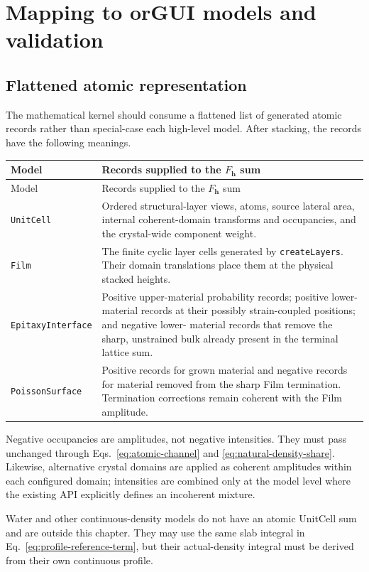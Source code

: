 \chapter{Mapping to orGUI models and validation}
\label{chap:mapping}

\section{Flattened atomic representation}

The mathematical kernel should consume a flattened list of generated atomic
records rather than special-case each high-level model.  After stacking, the
records have the following meanings.

\begin{longtable}{@{}p{}p{}@{}}
\toprule
Model & Records supplied to the $F_{\bm h}$ sum \\
\midrule
\endfirsthead
\toprule
Model & Records supplied to the $F_{\bm h}$ sum \\
\midrule
\endhead
\texttt{UnitCell}
& Ordered structural-layer views, atoms, source lateral area, internal
coherent-domain transforms and occupancies, and the crystal-wide component
weight. \\
\texttt{Film}
& The finite cyclic layer cells generated by \texttt{createLayers}.  Their
domain translations place them at the physical stacked heights. \\
\texttt{EpitaxyInterface}
& Positive upper-material probability records; positive lower-material
records at their possibly strain-coupled positions; and negative lower-
material records that remove the sharp, unstrained bulk already present in
the terminal lattice sum. \\
\texttt{PoissonSurface}
& Positive records for grown material and negative records for material
removed from the sharp Film termination.  Termination corrections remain
coherent with the Film amplitude. \\
\bottomrule
\end{longtable}

Negative occupancies are amplitudes, not negative intensities.  They must pass
unchanged through Eqs.~\eqref{eq:atomic-channel} and
\eqref{eq:natural-density-share}.  Likewise, alternative crystal domains are
applied as coherent amplitudes within each configured domain; intensities are
combined only at the model level where the existing API explicitly defines an
incoherent mixture.

Water and other continuous-density models do not have an atomic UnitCell sum
and are outside this chapter.  They may use the same slab integral in
Eq.~\eqref{eq:profile-reference-term}, but their actual-density integral must
be derived from their own continuous profile.

